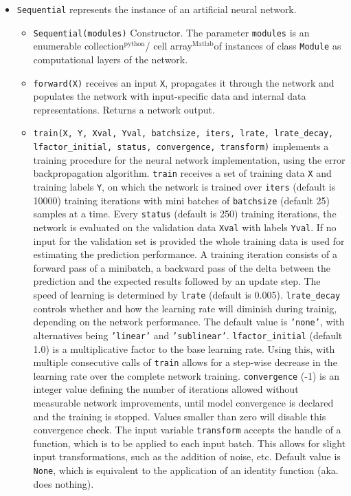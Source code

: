 \documentclass[a4wide]{article}
\newcommand{\mat}{$^\text{Matlab}$}
\newcommand{\py}{$^\text{python}$}
\begin{document}
\begin{itemize}
\begin{itemize}
		\item \texttt{Sequential} represents the instance of an artificial neural network.
			\begin{itemize}
				\item \texttt{Sequential(modules)} Constructor. The parameter \texttt{modules} is an enumerable collection\py / cell array\mat of instances of class \texttt{Module} as computational layers of the network.
				
				\item \texttt{forward(X)} receives an input \texttt{X}, propagates it through the network and populates the network with input-specific data and internal data representations. Returns a network output.
				
				\item \texttt{train(X, Y, Xval, Yval, batchsize, iters, lrate, lrate\_decay, lfactor\_initial, status, convergence, transform)} implements a training procedure for the neural network implementation, using the error backpropagation algorithm. \texttt{train} receives a set of training data \texttt{X}		 and training labels  \texttt{Y},   on which the network is trained over \texttt{iters} (default is 10000) training iterations with mini batches of \texttt{batchsize} (default 25) samples at a time. Every \texttt{status} (default is 250) training iterations, the network is evaluated on the validation data \texttt{Xval} with labels \texttt{Yval}. If no input for the validation set is provided the whole training data is used for estimating the prediction performance. A training iteration consists of a forward pass of a minibatch, a backward pass of the delta between the prediction and the expected results followed by an update step. The speed of learning is determined by \texttt{lrate} (default is 0.005). \texttt{lrate\_decay} controls whether and how the learning rate will diminish during trainig, depending on the network performance. The default value is \texttt{'none'}, with alternatives being \texttt{'linear'} and \texttt{'sublinear'}. \texttt{lfactor\_initial} (default 1.0) is a multiplicative factor to the base learning rate. Using this, with multiple consecutive calls of \texttt{train} allows for a step-wise decrease in the learning rate over the complete network training. \texttt{convergence} (-1) is an integer value defining the number of iterations allowed without measurable network improvements, until model convergence is declared and the training is stopped. Values smaller than zero will disable this convergence check. The input variable \texttt{transform} accepts the handle of a function, which is to be applied to each input batch. This allows for slight input transformations, such as the addition of noise, etc. Default value is \texttt{None}, which is equivalent to the application of an identity function (aka. does nothing).

\end{itemize}
\end{itemize}
\end{itemize}
\end{document}
